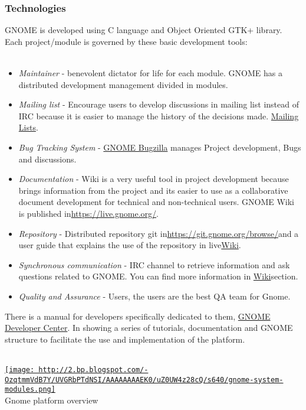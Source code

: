 \subsubsection{ Technologies} GNOME is developed using C language and Object Oriented GTK+ library. Each project/module is governed by these basic development tools:
\\
\\
\begin{itemize}
	\item \textit{Maintainer} - benevolent dictator for life for each module. GNOME has a distributed development management divided in modules.
	\item \textit{Mailing list} - Encourage users to develop discussions in mailing list instead of IRC because it is easier to manage the history of the decisions made. \href{https://mail.gnome.org/mailman/listinfo}{Mailing Lists}.
	\item \textit{Bug Tracking System} - \href{https://bugzilla.gnome.org/}{GNOME Bugzilla} manages Project development, Bugs and discussions.
	\item \textit{Documentation} - Wiki is a very useful tool in project development because brings information from the project and its easier to use as a collaborative document development for technical and non-technical users. GNOME Wiki is published in\nolinebreak\href{https://live.gnome.org/}{https://live.gnome.org/}.
	\item \textit{Repository} - Distributed repository git in\nolinebreak\href{https://git.gnome.org/browse/}{https://git.gnome.org/browse/}and a user guide that explains the use of the repository in live\nolinebreak\href{https://live.gnome.org/Git}{Wiki}.
	\item \textit{Synchronous communication} - IRC channel to retrieve information and ask questions related to GNOME. You can find more information in \href{https://live.gnome.org/GnomeIrcChannels}{Wiki}\nolinebreakIRC section.
	\item \textit{Quality and Assurance} - Users, the users are the best QA team for Gnome.
\end{itemize} There is a manual for developers specifically dedicated to them, \href{https://developer.gnome.org/}{GNOME Developer Center}. In showing a series of tutorials, documentation and GNOME structure to facilitate the use and implementation of the platform.
\\
\\
\begin{tabular}\href{http://2.bp.blogspot.com/-OzqtmmVdB7Y/UVGRbPTdNSI/AAAAAAAAEK0/uZ0UW4z28cQ/s1600/gnome-system-modules.png}{
\texttt{[image: http://2.bp.blogspot.com/-OzqtmmVdB7Y/UVGRbPTdNSI/AAAAAAAAEK0/uZ0UW4z28cQ/s640/gnome-system-modules.png]}} \\ 
Gnome platform overview
\end{tabular}

